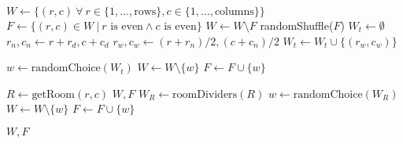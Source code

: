 \documentclass{article}
\begin{document}
\begin{algorithmic}
        \State $W \gets \{(r, c) ~\forall~ r \in \{1, \ldots, \text{rows}\}, c \in \{1, \ldots, \text{columns}\}\}$
        \State $F \gets \{(r, c) \in W~|~ r \text{ is even} \land c \text{ is even}\}$
        \State $W \gets W \setminus F$
        \State randomShuffle($F$)
            \State $W_t \gets \emptyset$
                \State $r_n, c_n \gets r + r_d, c + c_d$
                \State $r_w, c_w \gets (r + r_n)/2, (c + c_n)/2$
                    \State $W_t \gets W_t \cup \{(r_w, c_w)\}$
                \EndIf
            \EndFor

            \State $w \gets \text{randomChoice}(W_t)$
            \State $W \gets W \setminus \{w\}$
            \State $F \gets F \cup \{w\}$
        \EndFor

            \State $R \gets \text{getRoom}(r, c)$
                \State \Return $W, F$
            \EndIf
            \State $W_R \gets \text{roomDividers}(R)$
            \State $w \gets \text{randomChoice}(W_R)$
            \State $W \gets W \setminus \{w\}$
            \State $F \gets F \cup \{w\}$
        \EndFor

        \State \Return $W, F$
    \EndFunction
\end{algorithmic}
\end{document}
